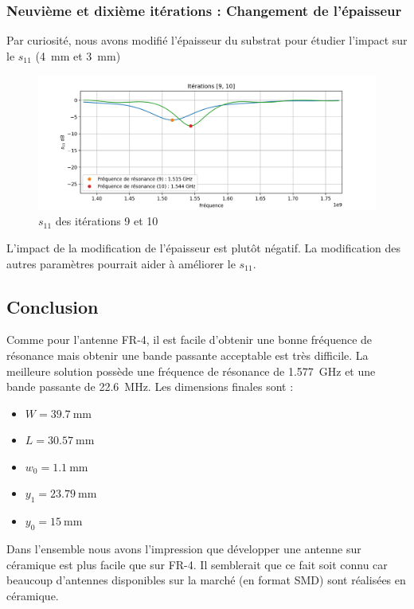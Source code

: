 \documentclass[Deriaz_Traiber_Labo02.tex]{subfiles}
\begin{document}
\subsubsection{Neuvième et dixième itérations : Changement de l'épaisseur}
Par curiosité, nous avons modifié l'épaisseur du substrat pour étudier l'impact sur le $s_{11}$ (\SI{4}{\milli\meter} et \SI{3}{\milli\meter})
\begin{figure}[H]
\centering
\includegraphics[width=15cm]{../Calculs/run_id_ceramique_910.png}
\caption[caption]{$s_{11}$ des itérations 9 et 10}
\end{figure}
L'impact de la modification de l'épaisseur est plutôt négatif. La modification des autres paramètres pourrait aider à améliorer le $s_{11}$.
\subsection{Conclusion}
Comme pour l'antenne FR-4, il est facile d'obtenir une bonne fréquence de résonance mais obtenir une bande passante acceptable est très difficile. La meilleure solution possède une fréquence de résonance de \SI{1.577}{\giga\hertz} et une bande passante de \SI{22.6}{\mega\hertz}. Les dimensions finales sont :
\begin{itemize}
\item $W=\SI{39.7}{\milli\meter}$
\item $L=\SI{30.57}{\milli\meter}$
\item $w_0=\SI{1.1}{\milli\meter}$
\item $y_1=\SI{23.79}{\milli\meter}$
\item $y_0=\SI{15}{\milli\meter}$
\end{itemize}
Dans l'ensemble nous avons l'impression que développer une antenne sur céramique est plus facile que sur FR-4. Il semblerait que ce fait soit connu car beaucoup d'antennes disponibles sur la marché (en format SMD) sont réalisées en céramique.
\end{document}
